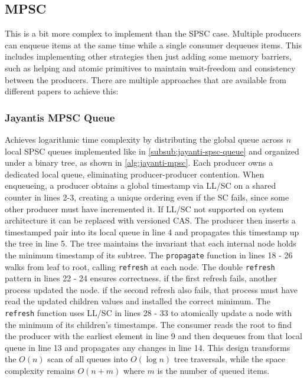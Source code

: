 \subsection{\acf{MPSC}}\label{subsec:multiple-producer-and-single-consumer}
This is a bit more complex to implement than the \ac{SPSC} case. Multiple producers can enqueue items at the same time while a single consumer dequeues items. This includes implementing other strategies then just adding some memory barriers, such as helping and atomic primitives to maintain wait-freedom and consistency between the producers. There are multiple approaches that are available from different papers to achieve this:

\subsubsection{Jayantis \ac{MPSC} Queue}\label{subsub:jayanti-mpsc-queue}
Achieves logarithmic time complexity by distributing the global queue across $n$ local \ac{SPSC} queues implemented like in \cref{subsub:jayanti-spsc-queue} and organized under a binary tree, as shown in \cref{alg:jayanti-mpsc}. Each producer owns a dedicated local queue, eliminating producer-producer contention. When enqueueing, a producer obtains a global timestamp via \ac{LL/SC} on a shared counter in lines 2-3, creating a unique ordering even if the SC fails, since some other producer must have incremented it. If \ac{LL/SC} not supported on system architecture it can be replaced with versioned \ac{CAS}. The producer then inserts a timestamped pair into its local queue in line 4 and propagates this timestamp up the tree in line 5. The tree maintains the invariant that each internal node holds the minimum timestamp of its subtree. The \texttt{propagate} function in lines 18 - 26 walks from leaf to root, calling \texttt{refresh} at each node. The double \texttt{refresh} pattern in lines 22 - 24 ensures correctness. if the first refresh fails, another process updated the node. if the second refresh also fails, that process must have read the updated children values and installed the correct minimum. The \texttt{refresh} function uses \ac{LL/SC} in lines 28 - 33 to atomically update a node with the minimum of its children's timestamps. The consumer reads the root to find the producer with the earliest element in line 9 and then dequeues from that local queue in line 13 and propagates any changes in line 14. This design transforms the $O(n)$ scan of all queues into $O(\log n)$ tree traversals, while the space complexity remains $O(n + m)$ where $m$ is the number of queued items. \cite{JayantiLog}

